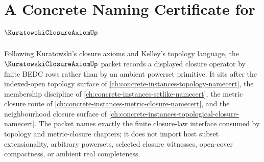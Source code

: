\chapter{A Concrete Naming Certificate for $\KuratowskiClosureAxiomUp$}
\label{ch:concrete-instances-kuratowski-closure-axiom-namecert}

Following Kuratowski's closure axioms and Kelley's topology language, the $\KuratowskiClosureAxiomUp$ packet records a displayed closure operator by finite BEDC rows rather than by an ambient powerset primitive. It sits after the indexed-open topology surface of \autoref{ch:concrete-instances-topology-namecert}, the membership discipline of \autoref{ch:concrete-instances-setlike-namecert}, the metric closure route of \autoref{ch:concrete-instances-metric-closure-namecert}, and the neighbourhood closure surface of \autoref{ch:concrete-instances-topological-closure-namecert}. The packet names exactly the finite closure-law interface consumed by topology and metric-closure chapters; it does not import host subset extensionality, arbitrary powersets, selected closure witnesses, open-cover compactness, or ambient real completeness.

